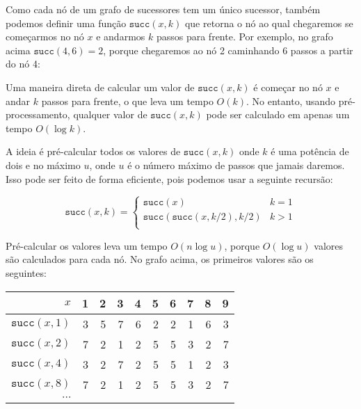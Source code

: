 Como cada nó de um grafo de sucessores tem um
único sucessor, também podemos definir uma função $\texttt{succ}(x,k)$
que retorna o nó ao qual chegaremos se
começarmos no nó $x$ e andarmos $k$ passos para frente.
Por exemplo, no grafo acima $\texttt{succ}(4,6)=2$,
porque chegaremos ao nó 2 caminhando 6 passos a partir do nó 4:

\begin{center}
\end{center}

Uma maneira direta de calcular um valor de $\texttt{succ}(x,k)$
é começar no nó $x$ e andar $k$ passos para frente, o que leva um tempo $O(k)$.
No entanto, usando pré-processamento, qualquer valor de $\texttt{succ}(x,k)$
pode ser calculado em apenas um tempo $O(\log k)$.

A ideia é pré-calcular todos os valores de $\texttt{succ}(x,k)$ onde
$k$ é uma potência de dois e no máximo $u$, onde $u$ é
o número máximo de passos que jamais daremos.
Isso pode ser feito de forma eficiente, pois
podemos usar a seguinte recursão:

\begin{equation*}
    \texttt{succ}(x,k) = \begin{cases}
               \texttt{succ}(x)              & k = 1\\
               \texttt{succ}(\texttt{succ}(x,k/2),k/2)   & k > 1\\
           \end{cases}
\end{equation*}

Pré-calcular os valores leva um tempo $O(n \log u)$,
porque $O(\log u)$ valores são calculados para cada nó.
No grafo acima, os primeiros valores são os seguintes:

\begin{center}
\begin{tabular}{r|rrrrrrrrr}
$x$ & 1 & 2 & 3 & 4 & 5 & 6 & 7 & 8 & 9 \\
\hline
$\texttt{succ}(x,1)$ & 3 & 5 & 7 & 6 & 2 & 2 & 1 & 6 & 3 \\
$\texttt{succ}(x,2)$ & 7 & 2 & 1 & 2 & 5 & 5 & 3 & 2 & 7 \\
$\texttt{succ}(x,4)$ & 3 & 2 & 7 & 2 & 5 & 5 & 1 & 2 & 3 \\
$\texttt{succ}(x,8)$ & 7 & 2 & 1 & 2 & 5 & 5 & 3 & 2 & 7 \\
$\cdots$ \\
\end{tabular}
\end{center}

